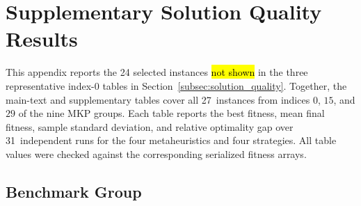 \documentclass[mathematics,article,accept,moreauthors]{Definitions/mdpi}
\begin{document}
\section{Supplementary Solution Quality Results}
\label{sec:appendix_tables}

This appendix reports the 24 selected instances \hl{not shown} %
 in the three
representative index-$0$ tables in Section~\ref{subsec:solution_quality}.
Together, the main-text and supplementary tables cover all 27~instances
from indices $0$, $15$, and $29$ of the nine MKP groups. Each table reports
the best fitness, mean final fitness, sample standard deviation, and
relative optimality gap over 31~independent runs for the four
metaheuristics and four strategies. All table values were checked against
the corresponding serialized fitness arrays.

\subsection{Benchmark Group }

\vspace{-9pt}
\end{document}
